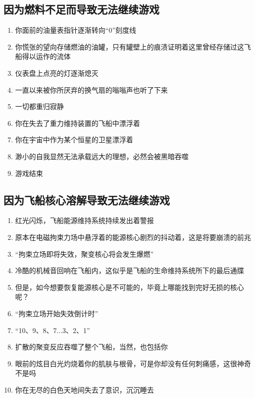 \documentclass{ctexart}
\begin{document}
		\subsection{因为燃料不足而导致无法继续游戏}
			\begin{enumerate}
				\item 你面前的油量表指针逐渐转向“0”刻度线
				\item 你慌张的望向存储燃油的油罐，只有罐壁上的痕渍证明着这里曾经存储过这飞船得以运作的流体
				\item 仪表盘上点亮的灯逐渐熄灭
				\item 一直以来被你所厌弃的换气扇的嗡嗡声也听了下来
				\item 一切都重归寂静
				\item 你在失去了重力维持装置的飞船中漂浮着
				\item 你在宇宙中作为某个恒星的卫星漂浮着
				\item 渺小的自我显然无法承载远大的理想，必然会被黑暗吞噬
				\item 游戏结束
			\end{enumerate}
		\subsection{因为飞船核心溶解导致无法继续游戏}
			\begin{enumerate}
				\item 红光闪烁，飞船能源维持系统持续发出着警报
				\item 原本在电磁拘束力场中悬浮着的能源核心剧烈的抖动着，这是将要崩溃的前兆
				\item “拘束立场即将失效，聚变核心将会发生爆燃”
				\item 冷酷的机械音回响在飞船内，这似乎是飞船的生命维持系统所下的最后通牒
				\item 但是，如今想要恢复能源核心是不可能的，毕竟上哪能找到完好无损的核心呢？
				\item “拘束立场开始失效倒计时”
				\item “10、9、8、7...3、2、1”
				\item 扩散的聚变反应吞噬了整个飞船，当然，也包括你
				\item 眼前的炫目白光灼烧着你的肌肤与根骨，可是你却没有任何刺痛感，这很神奇不是吗
				\item 你在无尽的白色天地间失去了意识，沉沉睡去
			\end{enumerate}
\end{document}
